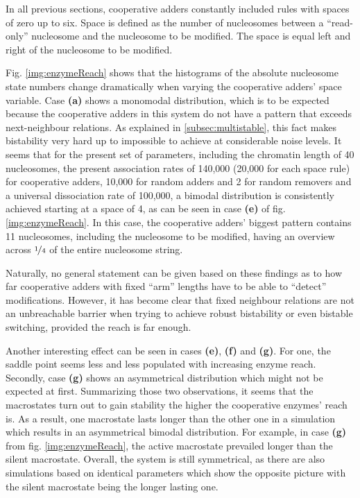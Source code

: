             In all previous sections, cooperative adders constantly included rules with spaces of zero up to six. Space is defined as the number of nucleosomes between a “read-only” nucleosome and the nucleosome to be modified. The space is equal left and right of the nucleosome to be modified.

            Fig. \ref{img:enzymeReach} shows that the histograms of the absolute nucleosome state numbers change dramatically when varying the cooperative adders' space variable. Case \textbf{(a)} shows a monomodal distribution, which is to be expected because the cooperative adders in this system do not have a pattern that exceeds next-neighbour relations. As explained in \ref{subsec:multistable}, this fact makes bistability very hard up to impossible to achieve at considerable noise levels. It seems that for the present set of parameters, including the chromatin length of 40 nucleosomes, the present association rates of 140,000 (20,000 for each space rule) for cooperative adders, 10,000 for random adders and 2 for random removers and a universal dissociation rate of 100,000, a bimodal distribution is consistently achieved starting at a space of 4, as can be seen in case \textbf{(e)} of fig. \ref{img:enzymeReach}. In this case, the cooperative adders' biggest pattern contains 11 nucleosomes, including the nucleosome to be modified, having an overview across $\nicefrac{1}{4}$ of the entire nucleosome string.

            Naturally, no general statement can be given based on these findings as to how far cooperative adders with fixed “arm” lengths have to be able to “detect” modifications. However, it has become clear that fixed neighbour relations are not an unbreachable barrier when trying to achieve robust bistability or even bistable switching, provided the reach is far enough.

            Another interesting effect can be seen in cases \textbf{(e)}, \textbf{(f)} and \textbf{(g)}. For one, the saddle point seems less and less populated with increasing enzyme reach. Secondly, case \textbf{(g)} shows an asymmetrical distribution which might not be expected at first. Summarizing those two observations, it seems that the macrostates turn out to gain stability the higher the cooperative enzymes' reach is. As a result, one macrostate lasts longer than the other one in a simulation which results in an asymmetrical bimodal distribution. For example, in case \textbf{(g)} from fig. \ref{img:enzymeReach}, the active macrostate prevailed longer than the silent macrostate. Overall, the system is still symmetrical, as there are also simulations based on identical parameters which show the opposite picture with the silent macrostate being the longer lasting one.

